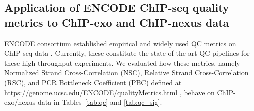 \documentclass{bmcart}
\begin{document}




\subsection*{Application of ENCODE ChIP-seq quality metrics to ChIP-exo and ChIP-nexus data}

ENCODE consortium established empirical and widely used QC metrics on ChIP-seq data \cite{encode_qc}. Currently, these constitute the state-of-the-art QC pipelines for these high throughput experiments. We evaluated how these metrics, namely Normalized Strand Cross-Correlation (NSC), Relative Strand Cross-Correlation (RSC), and PCR Bottleneck Coefficient (PBC) defined at \url{https://genome.ucsc.edu/ENCODE/qualityMetrics.html} \cite{encode_qc}, behave on ChIP-exo/nexus data in Tables~\ref{tab:qc} and \ref{tab:qc_sig}.
\end{document}
